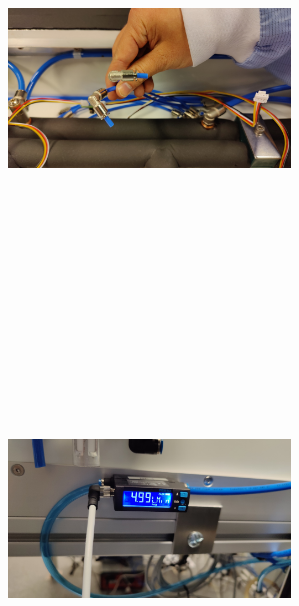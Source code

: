\begin{figure}[h]
    \begin{subfigure}[b]{0.45\textwidth}
        \centering
        \includegraphics[width=7.5cm,height=10cm,keepaspectratio]{Figures/test/airflow-1.jpg}
        \caption{}\label{fig:airflow1}
    \end{subfigure}
    ~
    \begin{subfigure}[b]{0.45\textwidth}
        \centering
        \includegraphics[width=7.5cm,height=10cm,keepaspectratio]{Figures/test/airflow-2.jpg}
        \caption{}\label{fig:airflow2}
    \end{subfigure}


\end{figure}

